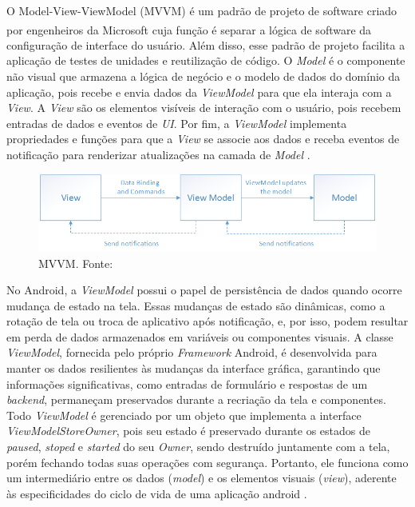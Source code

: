 O Model-View-ViewModel (MVVM) é um padrão de projeto de software criado por engenheiros da Microsoft\textsuperscript{\textregistered} 
cuja função é separar a lógica de software da configuração de interface do usuário. Além disso, esse padrão de projeto facilita a aplicação de testes de unidades e reutilização 
de código. O \textit{Model} é o componente não visual que armazena a lógica de negócio e o modelo de dados do domínio da aplicação, pois recebe e envia dados da \textit{ViewModel} 
para que ela interaja com a \textit{View}. A \textit{View} são os elementos visíveis de interação com o usuário, pois recebem entradas de dados e eventos de \textit{UI}. Por fim, a
\textit{ViewModel} implementa propriedades e funções para que a \textit{View} se associe aos dados e receba eventos de notificação para renderizar atualizações na camada de \textit{Model} \cite{mvvm-documentation}.

\begin{figure}[ht]
    \centering
    \includegraphics[width=.57\textwidth]{img/mvvm-pattern.png}
    \caption{MVVM. Fonte:\cite{mvvm-documentation}}\label{figMVVM}
\end{figure}

No Android, a \textit{ViewModel} possui o papel de persistência de dados quando ocorre mudança 
de estado na tela. Essas mudanças de estado são dinâmicas, como a rotação de tela ou troca de aplicativo após notificação, e, por isso, 
podem resultar em perda de dados armazenados em variáveis ou componentes visuais. A classe \textit{ViewModel}, fornecida pelo próprio 
\textit{Framework} Android, é desenvolvida para manter os dados resilientes às mudanças da interface gráfica, garantindo que informações significativas, como entradas de 
formulário e respostas de um \textit{backend}, permaneçam preservados durante a recriação da tela e componentes. Todo \textit{ViewModel} é gerenciado por um objeto 
que implementa a interface \textit{ViewModelStoreOwner}, pois seu estado é preservado durante os estados de \textit{paused}, \textit{stoped} e \textit{started} do seu \textit{Owner}, sendo destruído
juntamente com a tela, porém fechando todas suas operações com segurança. Portanto, ele funciona como um intermediário entre os dados (\textit{model}) e
os elementos visuais (\textit{view}), aderente às especificidades do ciclo de vida de uma aplicação android \cite{google-developers-viewmodel}.


